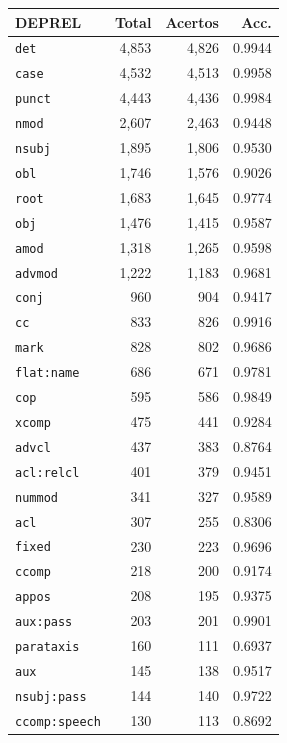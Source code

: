\begin{table}[ht]
\centering
\footnotesize
\begin{tabular}{lrrr}
\toprule
\textbf{DEPREL} & \textbf{Total} & \textbf{Acertos} & \textbf{Acc.} \\
\midrule
\texttt{det} & 4,853 & 4,826 & 0.9944 \\
\texttt{case} & 4,532 & 4,513 & 0.9958 \\
\texttt{punct} & 4,443 & 4,436 & 0.9984 \\
\texttt{nmod} & 2,607 & 2,463 & 0.9448 \\
\texttt{nsubj} & 1,895 & 1,806 & 0.9530 \\
\texttt{obl} & 1,746 & 1,576 & 0.9026 \\
\texttt{root} & 1,683 & 1,645 & 0.9774 \\
\texttt{obj} & 1,476 & 1,415 & 0.9587 \\
\texttt{amod} & 1,318 & 1,265 & 0.9598 \\
\texttt{advmod} & 1,222 & 1,183 & 0.9681 \\
\texttt{conj} & 960 & 904 & 0.9417 \\
\texttt{cc} & 833 & 826 & 0.9916 \\
\texttt{mark} & 828 & 802 & 0.9686 \\
\texttt{flat\!:\!name} & 686 & 671 & 0.9781 \\
\texttt{cop} & 595 & 586 & 0.9849 \\
\texttt{xcomp} & 475 & 441 & 0.9284 \\
\texttt{advcl} & 437 & 383 & 0.8764 \\
\texttt{acl\!:\!relcl} & 401 & 379 & 0.9451 \\
\texttt{nummod} & 341 & 327 & 0.9589 \\
\texttt{acl} & 307 & 255 & 0.8306 \\
\texttt{fixed} & 230 & 223 & 0.9696 \\
\texttt{ccomp} & 218 & 200 & 0.9174 \\
\texttt{appos} & 208 & 195 & 0.9375 \\
\texttt{aux\!:\!pass} & 203 & 201 & 0.9901 \\
\texttt{parataxis} & 160 & 111 & 0.6937 \\
\texttt{aux} & 145 & 138 & 0.9517 \\
\texttt{nsubj\!:\!pass} & 144 & 140 & 0.9722 \\
\texttt{ccomp\!:\!speech} & 130 & 113 & 0.8692 \\

\end{tabular}
\end{table}
